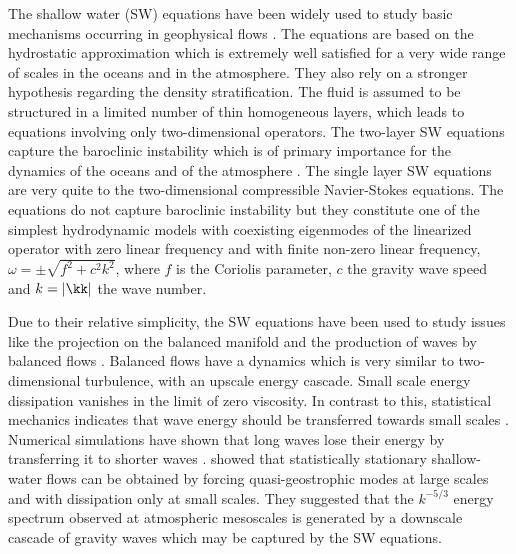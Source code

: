 The shallow water (SW) equations  have been widely used to study basic
mechanisms occurring in geophysical flows \cite[see for
example][]{VallisLIVRE2006}.
%
The equations are based on the hydrostatic approximation which is
extremely well satisfied for a very wide range of scales in the oceans
and in the atmosphere.  They also rely on a stronger hypothesis
regarding the density stratification.  The fluid is assumed to be
structured in a limited number of thin homogeneous layers, which leads
to equations involving only two-dimensional operators. The two-layer
SW equations capture the baroclinic instability which is of
primary importance for the dynamics of the oceans and of the
atmosphere \cite[]{VallisLIVRE2006, Wirth2013}.
%
The single layer SW equations are very quite to
the two-dimensional compressible Navier-Stokes equations.  The
equations do not capture baroclinic instability but they constitute
one of the simplest hydrodynamic models with coexisting eigenmodes of
the linearized operator with zero linear frequency and with finite
non-zero linear frequency, $\omega = \pm\sqrt{f^2 + c^2
k^2}$, where $f$ is the Coriolis parameter, $c$ the gravity wave speed and $k
= |\kk|$ the wave number.
%

%
Due to their relative simplicity, the SW equations have
been used to study issues like the projection on the balanced manifold
\cite[]{Lorenz1980, MohebalhojehDritschel2000} and the production of
waves by balanced flows \cite[]{FargeSadourny1989,
LahayeZeitlin2012,Vanneste2013}. Balanced flows have a dynamics which is very similar to
two-dimensional turbulence, with an upscale energy cascade. %
Small scale energy dissipation vanishes in the limit of zero
viscosity.
%
In contrast to this, statistical mechanics indicates that wave energy
should be transferred towards small scales \cite[]{Warn1986}.
Numerical simulations have shown that long waves lose their energy by
transferring it to shorter waves \cite[]{Sadourny1975,
FargeSadourny1989}.   \cite{YuanHamilton1994} showed that
statistically stationary shallow-water flows can be obtained by forcing
quasi-geostrophic modes at large scales and with dissipation only at
small scales. They suggested that the $ k^{-5/3} $ energy spectrum observed at   atmospheric mesoscales  \cite[]{NastromGage1985,LiLindborg2018} is generated by a downscale cascade of gravity waves which may be captured by the SW equations. 

